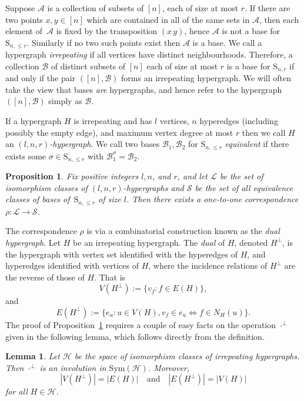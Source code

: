 \documentclass[10pt,a4paper]{amsart}
\renewcommand\S{\mathrm{S}}
\theoremstyle{plain}
\newtheorem{lemma}[cdrthm]{Lemma}
\newtheorem{prop}[cdrthm]{Proposition}
\theoremstyle{definition}
\theoremstyle{remark}
\begin{document}
Suppose $\mathcal{A}$ is a collection of subsets of $[n]$, each of size at most $r$. If there are two points $x,y\in [n]$ which are contained in all of the same sets in $\mathcal{A}$, then each element of~$\mathcal{A}$ is fixed by the transposition $(x\, y)$, hence $\mathcal{A}$ is not a base for $\S_{n,\leq r}$. Similarly if no two such points exist then $\mathcal{A}$ is a base. We call a hypergraph \emph{irrepeating} if all vertices have distinct neighbourhoods. Therefore, a collection $\mathcal{B}$ of distinct subsets of $[n]$ each of size at most $r$ is a base for $\S_{n,r}$ if and only if the pair $([n],\mathcal{B})$ forms an irrepeating hypergraph. We will often take the view that bases \emph{are} hypergraphs, and hence refer to the hypergraph $([n],\mathcal{B})$ simply as $\mathcal{B}$.

If a hypergraph $H$ is irrepeating and has $l$ vertices, $n$ hyperedges (including possibly the empty edge), and maximum vertex degree at most $r$ then we call $H$ an \emph{$(l,n,r)$-hypergraph}. We call two bases $\mathcal{B}_1,\mathcal{B}_2$ for $\S_{n,\leq r}$ \emph{equivalent} if there exists some $\sigma\in\S_{n,\leq r}$ with $\mathcal{B}_1^\sigma=\mathcal{B}_2$.

\begin{prop}\label{corr}
Fix positive integers $l,n$, and $r$, and let $\mathcal{L}$ be the set of isomorphism classes of $(l,n,r)$-hypergraphs and $\mathcal{S}$ be the set of all equivalence classes of bases of~$\S_{n,\leq r}$ of size $l$. Then there exists a one-to-one correspondence $\rho: \mathcal{L}\to\mathcal{S}$.
\end{prop}

The correspondence $\rho$ is via a combinatorial construction known as the \emph{dual hypergraph}. Let $H$ be an irrepeating hypergraph. The \emph{dual} of $H$, denoted $H^\perp$, is the hypergraph with vertex set identified with the hyperedges of $H$, and hyperedges identified with vertices of $H$, where the incidence relations of $H^\perp$ are the reverse of those of $H$. That is $$V(H^\perp):=\{v_f : f\in E(H)\},$$ and $$E(H^\perp):=\{e_u : u\in V(H), v_{f}\in e_u\iff f\in N_H(u)\}.$$ The proof of Proposition~\ref{corr} requires a couple of easy facts on the operation $\cdot^\perp$ given in the following lemma, which follows directly from the definition.

\begin{lemma}\label{dual}
Let $\mathcal{H}$ be the space of isomorphism classes of irrepeating hypergraphs. Then $\cdot^\perp$ is an involution in $\mathrm{Sym}(\mathcal{H})$. Moreover, $$|V(H^\perp)|=|E(H)|\quad\text{and}\quad|E(H^\perp)|=|V(H)|$$ for all $H\in\mathcal{H}$.
\end{lemma}
\end{document}
